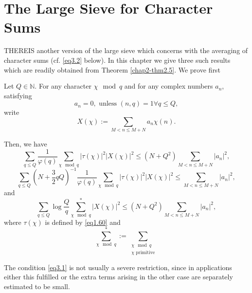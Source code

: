 
\chapter{The Large Sieve for Character Sums}\label{chap3}%

THERE\pageoriginale IS another version of the large sieve which
concerns with the averaging of character sums (cf. \eqref{eq3.2} below). In
this chapter we give three such results which are readily obtained
from Theorem \ref{chap2-thm2.5}. We prove first 

\setcounter{section}{3}
\setcounter{theorem}{0}
\begin{theorem}\label{chap3-thm3.1}%
Let $Q \in \mathbb{N}$. For any character $\chi \mod q$ and for any
complex numbers $a_n$, satisfying 
\begin{equation*}
a_n=0, \text{ unless }(n,q)=1 \forall q \leq Q, \tag{3.1}\label{eq3.1}
\end{equation*}
write
\begin{equation*}
X(\chi):=\sum_{M < n \leq M + N} a_n \chi(n). \tag{3.2}\label{eq3.2}
\end{equation*}
\end{theorem}

Then, we have
\begin{equation*}
\sum_{q \leq Q} \frac{1}{\varphi (q)} \sum _{\chi \mod q}|\tau (\chi)|^2
|X(\chi)|^2 \leq (N+Q^2)\sum_{M<n \leq M+N} |a_n|^2, \tag{3.3}\label{eq3.3} 
\end{equation*}
\begin{equation*}
\sum_{q \leq Q}(N+\frac{3}{2}qQ)^{-1} \frac{1}{\varphi (q)} \sum_{\chi
  \mod q}|\tau (\chi)|^2|X (\chi)|^2 \leq \sum_{M < n \leq M+N} |a_n|^2,
\tag{3.4}\label{eq3.4} 
\end{equation*}
and
\begin{equation*}
\sum_{q \leq Q} \log \frac{Q}{q} \sum^{*}_{\chi \mod q}|X(\chi)|^2
\leq (N+Q^2) \sum_{M< n\leq M+N} |a_n|^2, \tag{3.5}\label{eq3.5} 
\end{equation*}
where $\tau(\chi)$ is defined by \eqref{eq1.60} and
\begin{equation*}
\sum_{\chi \mod q}^{*}:=\sum_{\substack{\chi \mod q \\ \chi \text{ primitive}}}
\tag{3.6}\label{eq3.6} 
\end{equation*}

\begin{remark*}%
The condition \eqref{eq3.1} is not usually a severe restriction, since
in applications either this fulfilled or the extra terms arising in
the other case are separately estimated to be small. 
\end{remark*}

